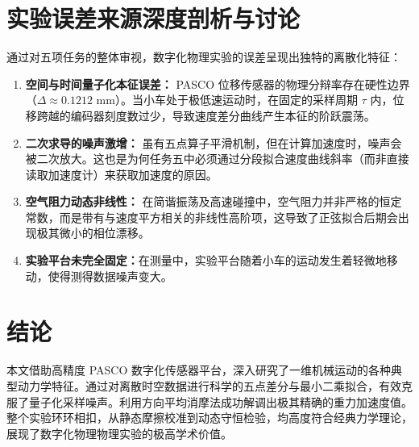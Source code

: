 \documentclass[twocolumn,zihao=5,a4paper]{ctexart} %
\begin{document}
	\section{实验误差来源深度剖析与讨论}
	通过对五项任务的整体审视，数字化物理实验的误差呈现出独特的离散化特征：
	\begin{enumerate}
		\item {\bf 空间与时间量子化本征误差：} PASCO 位移传感器的物理分辩率存在硬性边界（$\Delta \approx 0.1212\text{ mm}$）。当小车处于极低速运动时，在固定的采样周期 $\tau$ 内，位移跨越的编码器刻度数过少，导致速度差分曲线产生本征的阶跃震荡。
		\item {\bf 二次求导的噪声激增：} 虽有五点算子平滑机制，但在计算加速度时，噪声会被二次放大。这也是为何任务五中必须通过分段拟合速度曲线斜率（而非直接读取加速度计）来获取加速度的原因。
		\item {\bf 空气阻力动态非线性：} 在简谐振荡及高速碰撞中，空气阻力并非严格的恒定常数，而是带有与速度平方相关的非线性高阶项，这导致了正弦拟合后期会出现极其微小的相位漂移。
		\item {\bf 实验平台未完全固定：}在测量中，实验平台随着小车的运动发生着轻微地移动，使得测得数据噪声变大。
	\end{enumerate}
	
	\section{结论}
	本文借助高精度 PASCO 数字化传感器平台，深入研究了一维机械运动的各种典型动力学特征。通过对离散时空数据进行科学的五点差分与最小二乘拟合，有效克服了量子化采样噪声。利用方向平均消摩法成功解调出极其精确的重力加速度值。整个实验环环相扣，从静态摩擦校准到动态守恒检验，均高度符合经典力学理论，展现了数字化物理物理实验的极高学术价值。
	
\end{document}
